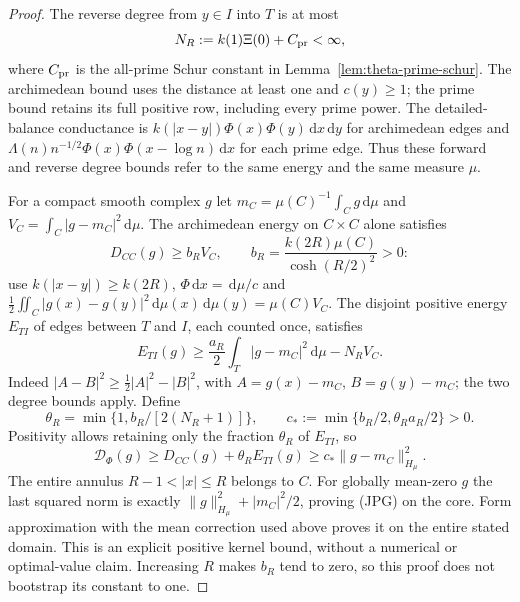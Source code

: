 \documentclass[11pt]{article}
\theoremstyle{remark}\newtheorem{remark}[theorem]{Remark}
\newcommand{\dd}{\,\mathrm d}
\begin{document}
\begin{proof}
The reverse degree from $y\in I$ into $T$ is at most
\[
 N_R:=k(1)\Xi(0)+C_{\rm pr}<\infty,
\]
where $C_{\rm pr}$ is the all-prime Schur constant in
Lemma~\ref{lem:theta-prime-schur}. The archimedean bound uses
the distance at least one and $c(y)\ge1$; the prime bound
retains its full positive row, including every prime power.
The detailed-balance conductance is
$k(|x-y|)\Phi(x)\Phi(y)\dd x\dd y$ for archimedean edges
and $\Lambda(n)n^{-1/2}\Phi(x)\Phi(x-\log n)\dd x$
for each prime edge. Thus these forward and reverse degree
bounds refer to the same energy and the same measure $\mu$.

For a compact smooth complex $g$ let
$m_C=\mu(C)^{-1}\int_Cg\dd\mu$ and
$V_C=\int_C|g-m_C|^2\dd\mu$.
The archimedean energy on $C\times C$ alone satisfies
\[
 D_{CC}(g)\ge b_R V_C,\qquad
 b_R=\frac{k(2R)\mu(C)}{\cosh(R/2)^2}>0:
\]
use $k(|x-y|)\ge k(2R)$,
$\Phi\dd x=\dd\mu/c$ and
$\tfrac12\iint_C|g(x)-g(y)|^2\dd\mu(x)\dd\mu(y)=\mu(C)V_C$.
The disjoint positive energy $E_{TI}$ of edges between $T$
and $I$, each counted once, satisfies
\[
 E_{TI}(g)\ge\frac{a_R}{2}\int_T|g-m_C|^2\dd\mu-N_RV_C.
\]
Indeed $|A-B|^2\ge\tfrac12|A|^2-|B|^2$, with
$A=g(x)-m_C$, $B=g(y)-m_C$; the two degree bounds apply.
Define
\[
 \theta_R=\min\{1,b_R/[2(N_R+1)]\},\qquad
 c_*:=\min\{b_R/2,\theta_Ra_R/2\}>0.
\]
Positivity allows retaining only the fraction $\theta_R$ of
$E_{TI}$, so
\[
 \mathcal D_\Phi(g)\ge D_{CC}(g)+\theta_RE_{TI}(g)
               \ge c_*\|g-m_C\|_{H_\mu}^2.
\]
The entire annulus $R-1<|x|\le R$ belongs to $C$.
For globally mean-zero $g$ the last squared norm is exactly
$\|g\|_{H_\mu}^2+|m_C|^2/2$, proving (JPG) on the core.
Form approximation with the mean correction used above proves
it on the entire stated domain. This is an explicit positive
kernel bound, without a numerical or optimal-value claim.
Increasing $R$ makes $b_R$ tend to zero, so this proof does
not bootstrap its constant to one.
\end{proof}
\end{document}
